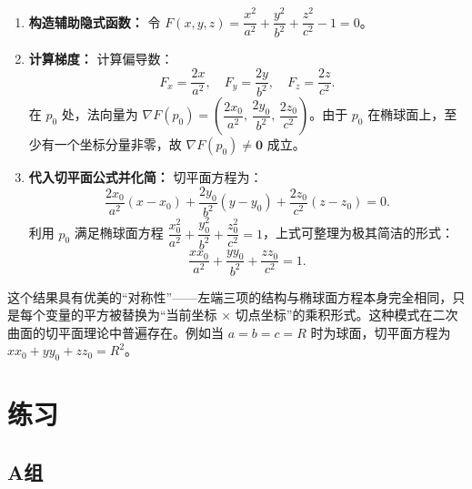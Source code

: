 \documentclass[lang=cn,11pt]{elegantbook}
\begin{document}
\begin{solution}
\begin{enumerate}
  \item \textbf{构造辅助隐式函数：}
  令 $F(x,y,z)=\dfrac{x^2}{a^2}+\dfrac{y^2}{b^2}+\dfrac{z^2}{c^2}-1=0$。

  \item \textbf{计算梯度：}
  计算偏导数：
  \[
  F_x=\frac{2x}{a^2},\quad F_y=\frac{2y}{b^2},\quad F_z=\frac{2z}{c^2}.
  \]
  在 $p_0$ 处，法向量为 $\nabla F(p_0)=\left(\dfrac{2x_0}{a^2},\,\dfrac{2y_0}{b^2},\,\dfrac{2z_0}{c^2}\right)$。由于 $p_0$ 在椭球面上，至少有一个坐标分量非零，故 $\nabla F(p_0) \neq \boldsymbol{0}$ 成立。

  \item \textbf{代入切平面公式并化简：}
  切平面方程为：
  \[
  \frac{2x_0}{a^2}(x-x_0)+\frac{2y_0}{b^2}(y-y_0)+\frac{2z_0}{c^2}(z-z_0)=0.
  \]
  利用 $p_0$ 满足椭球面方程 $\dfrac{x_0^2}{a^2}+\dfrac{y_0^2}{b^2}+\dfrac{z_0^2}{c^2}=1$，上式可整理为极其简洁的形式：
  \[
  \boxed{\frac{xx_0}{a^2}+\frac{yy_0}{b^2}+\frac{zz_0}{c^2}=1}.
  \]
\end{enumerate}
\end{solution}

\begin{remark}
这个结果具有优美的“对称性”——左端三项的结构与椭球面方程本身完全相同，只是每个变量的平方被替换为“当前坐标 $\times$ 切点坐标”的乘积形式。这种模式在二次曲面的切平面理论中普遍存在。例如当 $a=b=c=R$ 时为球面，切平面方程为 $xx_0+yy_0+zz_0=R^2$。
\end{remark}

\section{练习}

\subsection{A组}
\end{document}
